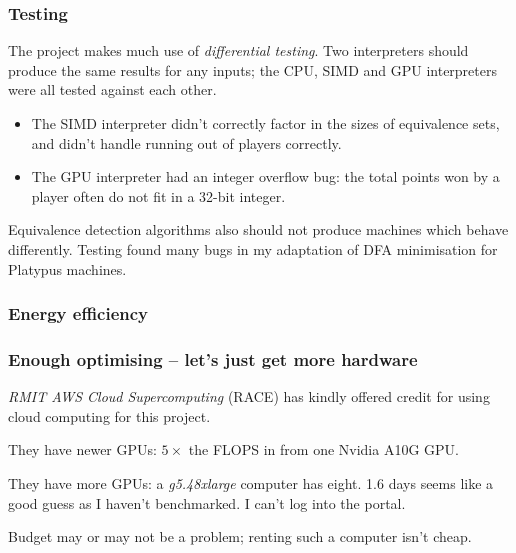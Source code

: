 \documentclass[aspectratio=169]{beamer}
\begin{document}
\begin{frame}
  \frametitle{Testing}
  
  The project makes much use of \emph{differential testing}. Two
  interpreters should produce the same results for any inputs; the
  CPU, SIMD and GPU interpreters were all tested against each other.

  \begin{itemize}
  \item The SIMD interpreter didn't correctly factor in the sizes of
    equivalence sets, and didn't handle running out of players
    correctly.
  \item The GPU interpreter had an integer overflow bug: the total
    points won by a player often do not fit in a 32-bit integer.
  \end{itemize}

  Equivalence detection algorithms also should not produce
  machines which behave differently. Testing found many bugs
  in my adaptation of DFA minimisation for Platypus machines.
\end{frame}

\begin{frame}[fragile]
  \frametitle{Energy efficiency}
  \begin{center}
  \end{center}
\end{frame}

\begin{frame}
  \frametitle{Enough optimising -- let's just get more hardware}

  \emph{RMIT AWS Cloud Supercomputing} (RACE) has kindly offered credit for
  using cloud computing for this project.

  They have newer GPUs: $5\times$ the FLOPS in from one Nvidia A10G GPU.
  
  They have more GPUs: a \emph{g5.48xlarge} computer has eight.
  1.6 days seems like a good guess\pause{} as I haven't benchmarked.
  I can't log into the portal.

  Budget may or may not be a problem; renting such a computer isn't cheap.
\end{frame}
\end{document}
